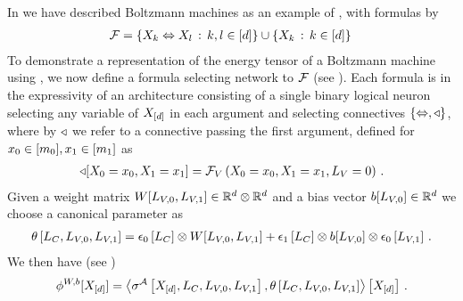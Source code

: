 \begin{example}
    \label{exa:boltzmannEnergySelection}
    In  we have described Boltzmann machines as an example of \MarkovLogicNetworks{}, with formulas by
    \begin{align*}
        \mathcal{F} = \{ X_{k} \Leftrightarrow X_{l} \,:\, k,l \in[d] \}
        \cup \{ X_{k}\,:\, k\in[d] \} \,
    \end{align*}
    To demonstrate a representation of the energy tensor of a Boltzmann machine using \SelectionSparsity{}, we now define a formula selecting network to $\mathcal{F}$ (see ).
    Each formula is in the expressivity of an architecture consisting of a single binary logical neuron selecting any variable of $X_{[d]}$ in each argument and selecting connectives $\{\Leftrightarrow,\triangleleft\}$, where by $\triangleleft$ we refer to a connective passing the first argument, defined for $x_{0}\in[m_{0}], x_{1}\in[m_{1}]$ as
    \begin{align*}
        \triangleleft[X_{0}=x_{0},X_{1}=x_{1}] = \mathcal{F}_{V}\left(X_{0}=x_{0},X_{1}=x_{1},L_{V}=0\right) \, .
    \end{align*}
    Given a weight matrix $W[L_{V,0},L_{V,1}] \in\mathbb{R}^{d}\otimes\mathbb{R}^{d}$ and a bias vector $b[L_{V,0}] \in\mathbb{R}^{d}$ we choose a canonical parameter as
    \begin{align*}
        \theta\left[L_{C},L_{V,0},L_{V,1}\right]
        = \epsilon_{0}\left[L_{C}\right] \otimes W[L_{V,0},L_{V,1}]
        + \epsilon_{1}\left[L_{C}\right] \otimes b[L_{V,0}] \otimes  \epsilon_{0}\left[L_{V,1}\right] \, .
    \end{align*}
    We then have (see )
    \begin{align*}
        \phi^{W,b}[X_{[d]}] =
        \left\langle \sigma^{\mathcal{A}}\left[X_{[d]},L_{C},L_{V,0},L_{V,1}\right],
            \theta\left[L_{C},L_{V,0},L_{V,1}\right]\right\rangle \left[ X_{[d]} \right] \, .
    \end{align*}
\end{example}

